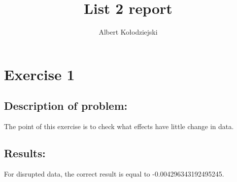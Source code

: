 \documentclass{article}
\title{List 2 report}
\author{Albert Kołodziejski}
\begin{document}
\maketitle
\section*{Exercise 1}

\subsection*{Description of problem:}
The point of this exercise is to check what effects have little change in data.

\subsection*{Results:}
For disrupted data, the correct result is equal to -0.004296343192495245.
\end{document}
